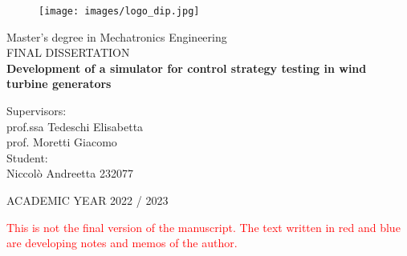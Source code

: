 \begin{figure}[H]
    \texttt{[image: images/logo\_dip.jpg]}
\end{figure}
\vspace{1.75cm}
\begin{center}
\huge
    Master's degree in Mechatronics Engineering\\ 
    \vspace{0.5 cm}
    FINAL DISSERTATION\\ 
    \vspace{1 cm}
    \textbf{Development of a simulator for control strategy testing in wind turbine generators}

\vspace{1.5 cm}

\normalsize
\end{center}
\Large
Supervisors: \\
prof.ssa Tedeschi Elisabetta\\ 
prof. Moretti Giacomo\\
Student:\\
Niccolò Andreetta 232077 \\ 

\vspace{0.5 cm}

\begin{center}
	ACADEMIC YEAR 2022 / 2023
\end{center}
\thispagestyle{empty}
\textcolor{red}{This is not the final version of the manuscript. The text written in red and blue are developing notes and memos of the author.}
\newpage



\newpage
\tableofcontents

\newpage
{} %
\printglossary[type=\acronymtype]
